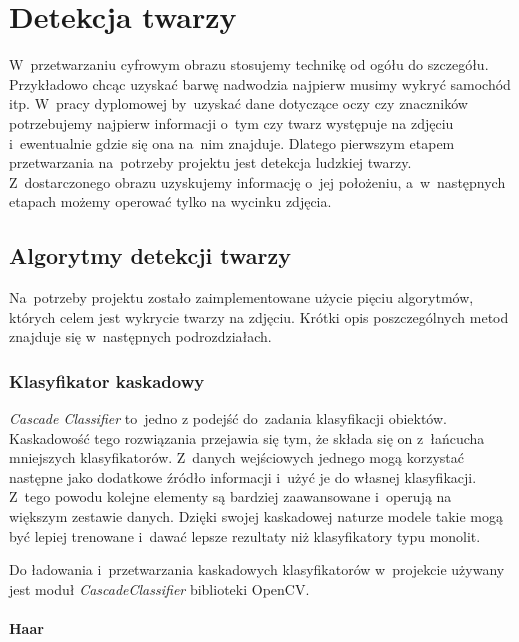 \newpage

\section{Detekcja twarzy} \label{section:face_detection}

W~przetwarzaniu cyfrowym obrazu stosujemy technikę od ogółu do szczegółu. Przykładowo chcąc uzyskać barwę nadwodzia najpierw musimy wykryć samochód itp. W~pracy dyplomowej by~uzyskać dane dotyczące oczy czy znaczników potrzebujemy najpierw informacji o~tym czy twarz występuje na zdjęciu i~ewentualnie gdzie się ona na~nim znajduje. Dlatego pierwszym etapem przetwarzania na~potrzeby projektu jest detekcja ludzkiej twarzy. Z~dostarczonego obrazu uzyskujemy informację o~jej położeniu, a~w~następnych etapach możemy operować tylko na wycinku zdjęcia. 

\subsection{Algorytmy detekcji twarzy}

Na~potrzeby projektu zostało zaimplementowane użycie pięciu algorytmów, których celem jest wykrycie twarzy na zdjęciu. Krótki opis poszczególnych metod znajduje się w~następnych podrozdziałach.

\subsubsection{Klasyfikator kaskadowy} \label{section:face_casacde_classifier}
\textit{Cascade Classifier} to~jedno z podejść do~zadania klasyfikacji obiektów. Kaskadowość tego rozwiązania przejawia się tym, że składa się on z~łańcucha mniejszych klasyfikatorów. Z~danych wejściowych jednego mogą korzystać następne jako dodatkowe źródło informacji i~użyć je do własnej klasyfikacji. Z~tego powodu kolejne elementy są bardziej zaawansowane i~operują na większym zestawie danych. Dzięki swojej kaskadowej naturze modele takie mogą być lepiej trenowane i~dawać lepsze rezultaty niż klasyfikatory typu monolit.

\vspace{5mm}

Do ładowania i~przetwarzania kaskadowych klasyfikatorów w~projekcie używany jest moduł \textit{CascadeClassifier} \cite{cascade_opencv} biblioteki OpenCV. 

\paragraph{Haar}

